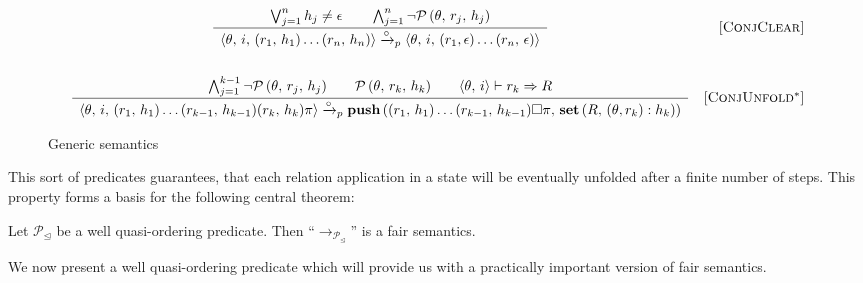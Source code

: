 \begin{figure*}[t]
\[\begin{array}{cr}
      \dfrac
      {
      \bigvee_{j=1}^n h_j \not= \epsilon \qquad
      \bigwedge_{j=1}^n \neg\mathcal{P}\,(\theta,\,r_j,\,h_j)
      }
      {\begin{array}{l}
      \langle \theta,\, i,\, (r_1,\,h_1) \ldots (r_n,\,h_n) \rangle \xrightarrow{\circ}_p \langle \theta,\, i,\, (r_1,\epsilon) \ldots (r_n,\, \epsilon) \rangle
      \end{array}}
      &  \mbox{[\textsc{ConjClear}]} \\[10mm]
      \dfrac
      {
       \bigwedge_{j=1}^{k-1} \neg\mathcal{P}\,(\theta,\, r_j,\, h_j) \qquad
       \mathcal{P}\,(\theta,\, r_k,\, h_k) \qquad
       \langle \theta,\, i \rangle \vdash r_k \Rightarrow R 
      }
      {
        \begin{array}{l}
          \langle \theta,\, i,\, (r_1,\,h_1) \ldots (r_{k-1},\,h_{k-1}) (r_k,\, h_k) \pi \rangle \xrightarrow{\circ}_p \mbox{\bf push}\,((r_1,\,h_1) \ldots (r_{k-1},\,h_{k-1})\Box \pi,\, \mbox{\bf set}\,(R, \, (\theta, r_k) : h_k))
         \end{array}
        }
&     \mbox{[\textsc{ConjUnfold$^*$}]} 
\end{array}\]
\caption{Generic semantics}
\label{fair:pred-fair-semantics}
\end{figure*}

This sort of predicates guarantees, that each relation application in a state will be eventually unfolded after a finite number of steps. This property
forms a basis for the following central theorem:

\begin{theorem}
  \label{thm:main}
  Let $\mathcal{P}_\trianglelefteq$ be a well quasi-ordering predicate. Then ``$\rightarrow_{\mathcal{P}_\trianglelefteq}$'' is a fair semantics.
\end{theorem}

We now present a well quasi-ordering predicate which will provide us with a practically important version of fair semantics. 


